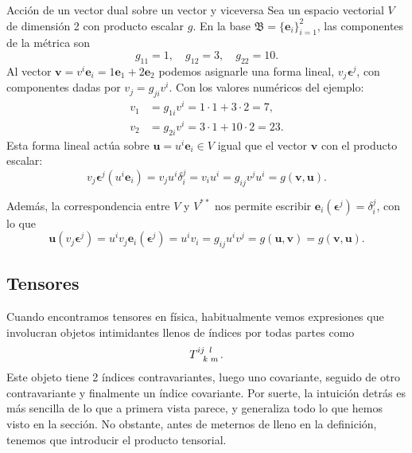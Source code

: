 \begin{example}
    {Acción de un vector dual sobre un vector y viceversa
    \label{ex.2acciones}}
    Sea un espacio vectorial \(V\) de dimensión 2 con producto escalar \(g\). En la base \(\mathfrak{B}=\{\mathbf{e}_i\}_{i=1}^2\), las componentes de la métrica son 
    \begin{equation*}
        g_{11} = 1,\quad g_{12} = 3,\quad g_{22} = 10.
    \end{equation*}
    Al vector \(\mathbf{v}=v^i\mathbf{e}_i=1\mathbf{e}_1+2\mathbf{e}_2\) podemos asignarle una forma lineal, \(v_j \boldsymbol{\epsilon}^j\), con componentes dadas por \(v_j = g_{ji}v^i\). Con los valores numéricos del ejemplo:
    \begin{align*}
        v_1 &= g_{1i}v^i = 1\cdot 1 + 3\cdot 2 = 7,\\
        v_2 &= g_{2i}v^i = 3\cdot 1 + 10\cdot 2 = 23.
    \end{align*}
    Esta forma lineal actúa sobre \(\mathbf{u} = u^i\mathbf{e}_i\in V\) igual que el vector \(\mathbf{v}\) con el producto escalar:
    \begin{equation*}
        v_j\boldsymbol{\epsilon}^j(u^i\mathbf{e}_i)= v_ju^i \delta_i^j = v_i u^i = g_{ij}v^j u^i = g(\mathbf{v},\mathbf{u}).
    \end{equation*}

    Además, la correspondencia entre \(V\) y \(V^{**}\) nos permite escribir \(\mathbf{e}_i(\boldsymbol{\epsilon}^j) = \delta_i^j\), con lo que 
    \begin{equation*}
        \mathbf{u}(v_j \boldsymbol{\epsilon}^j) = u^i v_j\mathbf{e}_i(\boldsymbol{\epsilon}^j) = u^i v_i = g_{ij}u^i v^j = g(\mathbf{u},\mathbf{v}) = g(\mathbf{v},\mathbf{u}).
    \end{equation*}
\end{example}

\subsection{Tensores}
\label{subsec.2formasmultilineales}

Cuando encontramos tensores en física, habitualmente vemos expresiones que involucran objetos intimidantes llenos de índices por todas partes como
\begin{equation}
    \tensor{T}{^i^j_k^l_m}.
\end{equation}
Este objeto tiene 2 índices contravariantes, luego uno covariante, seguido de otro contravariante y finalmente un índice covariante. Por suerte, la intuición detrás es más sencilla de lo que a primera vista parece, y generaliza todo lo que hemos visto en la sección. No obstante, antes de meternos de lleno en la definición, tenemos que introducir el producto tensorial.

